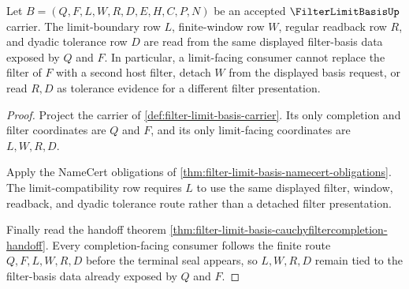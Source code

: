 \begin{theorem}
\label{thm:filter-limit-basis-limit-compatibility}
Let $B=(Q,F,L,W,R,D,E,H,C,P,N)$ be an accepted $\FilterLimitBasisUp$ carrier. The limit-boundary row $L$, finite-window row $W$, regular readback row $R$, and dyadic tolerance row $D$ are read from the same displayed filter-basis data exposed by $Q$ and $F$. In particular, a limit-facing consumer cannot replace the filter of $F$ with a second host filter, detach $W$ from the displayed basis request, or read $R,D$ as tolerance evidence for a different filter presentation.
\end{theorem}
\begin{proof}
Project the carrier of \autoref{def:filter-limit-basis-carrier}. Its only completion and filter coordinates are $Q$ and $F$, and its only limit-facing coordinates are $L,W,R,D$.

Apply the NameCert obligations of \autoref{thm:filter-limit-basis-namecert-obligations}. The limit-compatibility row requires $L$ to use the same displayed filter, window, readback, and dyadic tolerance route rather than a detached filter presentation.

Finally read the handoff theorem \autoref{thm:filter-limit-basis-cauchyfiltercompletion-handoff}. Every completion-facing consumer follows the finite route $Q,F,L,W,R,D$ before the terminal seal appears, so $L,W,R,D$ remain tied to the filter-basis data already exposed by $Q$ and $F$.
\end{proof}

